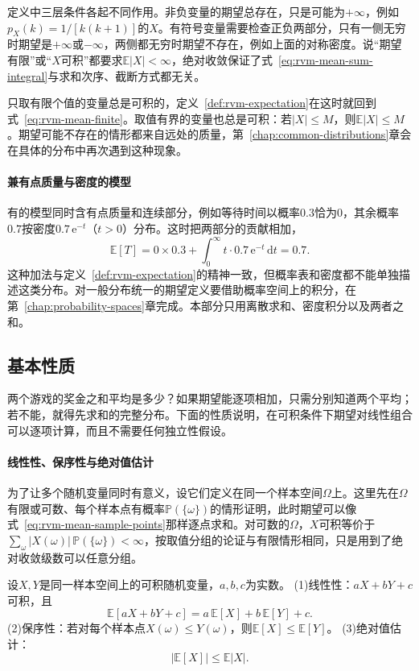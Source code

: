 定义中三层条件各起不同作用。非负变量的期望总存在，只是可能为$+\infty$，例如$p_X(k)=1/[k(k+1)]$的$X$。有符号变量需要检查正负两部分，只有一侧无穷时期望是$+\infty$或$-\infty$，两侧都无穷时期望不存在，例如上面的对称密度。说“期望有限”或“$X$可积”都要求$\mathbb{E}\lvert X\rvert<\infty$，绝对收敛保证了式~\eqref{eq:rvm-mean-sum-integral}与求和次序、截断方式都无关。

只取有限个值的变量总是可积的，定义~\ref{def:rvm-expectation}在这时就回到式~\eqref{eq:rvm-mean-finite}。取值有界的变量也总是可积：若$\lvert X\rvert\leq M$，则$\mathbb{E}\lvert X\rvert\leq M$。期望可能不存在的情形都来自远处的质量，第~\ref{chap:common-distributions}章会在具体的分布中再次遇到这种现象。

\paragraph{兼有点质量与密度的模型}
有的模型同时含有点质量和连续部分，例如等待时间以概率$0.3$恰为$0$，其余概率$0.7$按密度$0.7\,\mathrm{e}^{-t}$（$t>0$）分布。这时把两部分的贡献相加，
\[
 \mathbb{E}[T]=0\times0.3+\int_0^{\infty}t\cdot0.7\,\mathrm{e}^{-t}\,\mathrm{d}t=0.7 .
\]
这种加法与定义~\ref{def:rvm-expectation}的精神一致，但概率表和密度都不能单独描述这类分布。对一般分布统一的期望定义要借助概率空间上的积分，在第~\ref{chap:probability-spaces}章完成。本部分只用离散求和、密度积分以及两者之和。

\subsection{基本性质}
\label{sec:rvm-expectation-properties}

两个游戏的奖金之和平均是多少？如果期望能逐项相加，只需分别知道两个平均；若不能，就得先求和的完整分布。下面的性质说明，在可积条件下期望对线性组合可以逐项计算，而且不需要任何独立性假设。

\paragraph{线性性、保序性与绝对值估计}
为了让多个随机变量同时有意义，设它们定义在同一个样本空间$\Omega$上。这里先在$\Omega$有限或可数、每个样本点有概率$\mathbb{P}(\{\omega\})$的情形证明，此时期望可以像式~\eqref{eq:rvm-mean-sample-points}那样逐点求和。对可数的$\Omega$，$X$可积等价于$\sum_{\omega}\lvert X(\omega)\rvert\,\mathbb{P}(\{\omega\})<\infty$，按取值分组的论证与有限情形相同，只是用到了绝对收敛级数可以任意分组。

\begin{theorem}[期望的基本性质]
\label{thm:rvm-expectation-properties}
设$X,Y$是同一样本空间上的可积随机变量，$a,b,c$为实数。
(1)线性性：$aX+bY+c$可积，且
\begin{equation}
 \mathbb{E}[aX+bY+c]=a\,\mathbb{E}[X]+b\,\mathbb{E}[Y]+c .
 \label{eq:rvm-linearity}
\end{equation}
(2)保序性：若对每个样本点$X(\omega)\leq Y(\omega)$，则$\mathbb{E}[X]\leq\mathbb{E}[Y]$。
(3)绝对值估计：
\begin{equation}
 \lvert\mathbb{E}[X]\rvert\leq\mathbb{E}\lvert X\rvert .
 \label{eq:rvm-abs-bound}
\end{equation}
\end{theorem}

